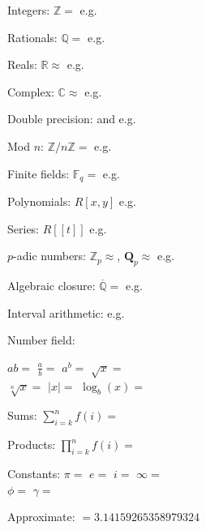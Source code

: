 \documentclass[a4paper]{article}
\newcommand{\ZZ}{\mathbb Z}
\newcommand{\FF}{\mathbb F}
\newcommand{\QQ}{\mathbb Q}
\newcommand{\RR}{\mathbb R}
\newcommand{\CC}{\mathbb C}
\begin{document}
\begin{multicols*}{3}

Integers: $\ZZ=$  \@ 
e.g. 

Rationals: $\QQ=$  \@ 
e.g. 

Reals: $\RR\approx$  \@ 
e.g. 

Complex: $\CC\approx$  \@ 
e.g. 

Double precision:  and  \@ 
e.g. 

Mod $n$: $\ZZ/n\ZZ = $  \@ 
e.g. 

Finite fields: $\FF_q=$  \@ 
e.g. 

Polynomials: $R[x,y]$ \@
e.g. 

Series: $R[[t]]$ \@
e.g. 

$p$-adic numbers: $\ZZ_p\approx$, $\mathbf Q_p\approx$ e.g. 

Algebraic closure: $\overline{\QQ} = $  e.g. 

Interval arithmetic:  e.g. 

Number field:  



$ab=$         \quad 
$\frac a b=$  \quad 
$a^b=$        \quad 
$\sqrt{x}=$ \\
$\sqrt[n]{x}=$   \quad 
$|x|=$            \quad 
$\log_b(x)=$ 

Sums:
$\displaystyle
\sum_{i=k}^n f(i)=$ 

Products:
$\displaystyle
\prod_{i=k}^n f(i)=$ 



Constants: 
$\pi=$  \quad 
$e=$  \quad 
$i=$  \quad 
$\infty=$  \\
$\phi=$  \quad 
$\gamma=$ 

Approximate:  $=3.14159265358979324$


\end{multicols*}
\end{document}
